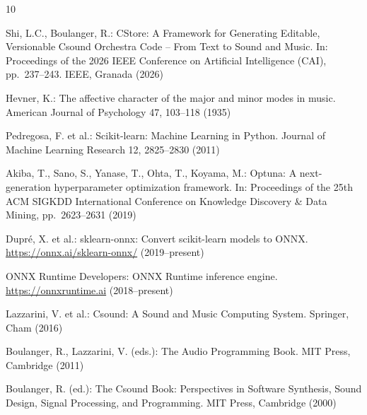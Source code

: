 \documentclass[runningheads,a4paper]{llncs}
\begin{document}
{\small\begin{thebibliography}{10}

Shi, L.C., Boulanger, R.: CStore: A Framework for Generating Editable,
Versionable Csound Orchestra Code -- From Text to Sound and Music. In:
Proceedings of the 2026 IEEE Conference on Artificial Intelligence (CAI),
pp.~237--243. IEEE, Granada (2026)

Hevner, K.: The affective character of the major and minor modes in music.
American Journal of Psychology 47, 103--118 (1935)

Pedregosa, F. et al.: Scikit-learn: Machine Learning in Python. Journal of
Machine Learning Research 12, 2825--2830 (2011)

Akiba, T., Sano, S., Yanase, T., Ohta, T., Koyama, M.: Optuna: A
next-generation hyperparameter optimization framework. In: Proceedings of the
25th ACM SIGKDD International Conference on Knowledge Discovery \& Data Mining,
pp.~2623--2631 (2019)

Dupré, X. et al.: sklearn-onnx: Convert scikit-learn models to ONNX.
\url{https://onnx.ai/sklearn-onnx/} (2019--present)

ONNX Runtime Developers: ONNX Runtime inference engine.
\url{https://onnxruntime.ai} (2018--present)

Lazzarini, V. et al.: Csound: A Sound and Music Computing System.
Springer, Cham (2016)

Boulanger, R., Lazzarini, V. (eds.): The Audio Programming Book.
MIT Press, Cambridge (2011)

Boulanger, R. (ed.): The Csound Book: Perspectives in Software Synthesis,
Sound Design, Signal Processing, and Programming.
MIT Press, Cambridge (2000)

\end{thebibliography}}
\end{document}
